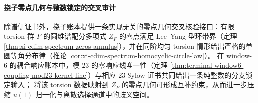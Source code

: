 \begin{remark}
\paragraph{挠子零点几何与整数锁定的交叉审计}
除谱侧证书外，挠子账本提供一条实现无关的零点几何交叉核验接口：有限 torsion 群 \(F\) 的圆维谱配分多项式 \(Z_F\) 的零点满足 Lee--Yang 型环带界（定理 \ref{thm:xi-cdim-spectrum-zeros-annulus}），并在同阶均匀 torsion 情形给出严格的单圆等角分布律（推论 \ref{cor:xi-cdim-spectrum-homocyclic-circle-law}）。
在 window-\(6\) 的耦合响应账本中，模 \(23\) 的零响应线唯一性（定理 \ref{thm:terminal-window6-coupling-mod23-kernel-line}）与相应 \(23\)-Sylow 证书共同给出一条纯整数的分支锁定输入；
将该 torsion 数据映射到 \(Z_F\) 的零点几何可形成互补约束，从而进一步压缩 \(u(1)\) 归一化与离散选择通道中的歧义空间。
\end{remark}


